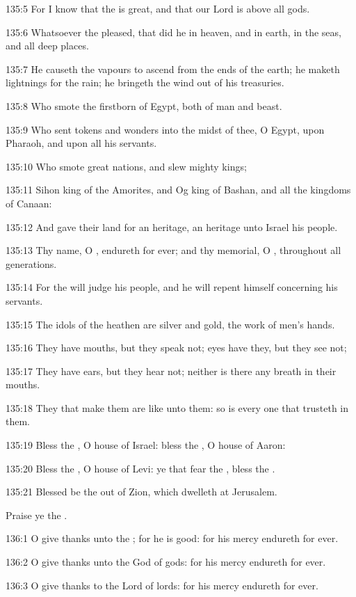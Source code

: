 135:5 For I know that the \LORD is great, and that our Lord is above
all gods.

135:6 Whatsoever the \LORD pleased, that did he in heaven, and in
earth, in the seas, and all deep places.

135:7 He causeth the vapours to ascend from the ends of the earth; he
maketh lightnings for the rain; he bringeth the wind out of his
treasuries.

135:8 Who smote the firstborn of Egypt, both of man and beast.

135:9 Who sent tokens and wonders into the midst of thee, O Egypt,
upon Pharaoh, and upon all his servants.

135:10 Who smote great nations, and slew mighty kings;

135:11 Sihon king of the Amorites, and Og king of Bashan, and all the
kingdoms of Canaan:

135:12 And gave their land for an heritage, an heritage unto Israel
his people.

135:13 Thy name, O \LORD, endureth for ever; and thy memorial, O \LORD,
throughout all generations.

135:14 For the \LORD will judge his people, and he will repent himself
concerning his servants.

135:15 The idols of the heathen are silver and gold, the work of men's
hands.

135:16 They have mouths, but they speak not; eyes have they, but they
see not;

135:17 They have ears, but they hear not; neither is there any breath
in their mouths.

135:18 They that make them are like unto them: so is every one that
trusteth in them.

135:19 Bless the \LORD, O house of Israel: bless the \LORD, O house of
Aaron:

135:20 Bless the \LORD, O house of Levi: ye that fear the \LORD, bless
the \LORD.

135:21 Blessed be the \LORD out of Zion, which dwelleth at Jerusalem.

Praise ye the \LORD.



136:1 O give thanks unto the \LORD; for he is good: for his mercy
endureth for ever.

136:2 O give thanks unto the God of gods: for his mercy endureth for
ever.

136:3 O give thanks to the Lord of lords: for his mercy endureth for
ever.

